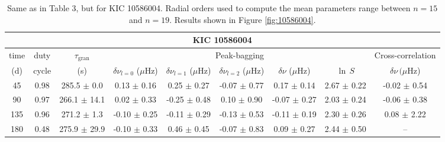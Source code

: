 \documentclass[twocolumn]{aastex61}%
\begin{document}
\begin{table}[ht]\centering\fontsize{9.}{7.}\selectfont
\begin{tabular}{ccc|ccccc|c}
\multicolumn{9}{c}{KIC 10586004}\\ \hline\hline
time & duty & $\tau_\text{gran}$ &\multicolumn{5}{c|}{Peak-bagging}&Cross-correlation\\
(d)& cycle & (s)&$\delta\nu_{l=0}$ ($\mu$Hz) & $\delta\nu_{l=1}$ ($\mu$Hz) & $\delta\nu_{l=2}$ ($\mu$Hz) & $\delta\nu$ ($\mu$Hz)& $\ln\,S$ & $\delta\nu\,(\mu$Hz)\\\hline
45 & 0.98 & 285.5 $\pm$ 0.0 & 0.13 $\pm$ 0.16 & 0.25 $\pm$ 0.27 & -0.07 $\pm$ 0.77 & 0.17 $\pm$ 0.14 & 2.67 $\pm$ 0.22 & -0.02 $\pm$ 0.54\\
90 & 0.97 & 266.1 $\pm$ 14.1 & 0.02 $\pm$ 0.33 & -0.25 $\pm$ 0.48 & 0.10 $\pm$ 0.90 & -0.07 $\pm$ 0.27 & 2.03 $\pm$ 0.24 & -0.06 $\pm$ 0.38\\
135 & 0.96 & 271.2 $\pm$ 1.3 & -0.10 $\pm$ 0.25 & -0.11 $\pm$ 0.29 & -0.13 $\pm$ 0.53 & -0.11 $\pm$ 0.19 & 2.30 $\pm$ 0.26 & 0.08 $\pm$ 2.22\\
180 & 0.48 & 275.9 $\pm$ 29.9 & -0.10 $\pm$ 0.33 & 0.46 $\pm$ 0.45 & -0.07 $\pm$ 0.83 & 0.09 $\pm$ 0.27 & 2.44 $\pm$ 0.50 & --\\
\end{tabular}
\parbox{2\hsize}{\caption{Same as in Table 3, but for KIC 10586004. Radial orders used to compute the mean parameters range between $n=15$ and $n=19$. Results shown in Figure \ref{fig:10586004}.}\label{tab:10586004}}
\end{table}
\end{document}
